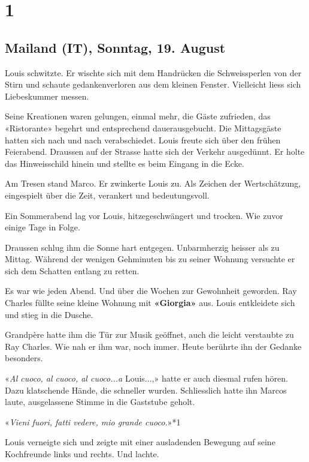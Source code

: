 \chapter{1}\label{section}
\endgroup

\section{Mailand (IT), Sonntag, 19.
August}\label{mailand-it-sonntag-19.-august}

Louis schwitzte. Er wischte sich mit dem Handrücken die Schweissperlen
von der Stirn und schaute gedankenverloren aus dem kleinen Fenster.
Vielleicht liess sich Liebeskummer messen.

Seine Kreationen waren gelungen, einmal mehr, die Gäste zufrieden, das
«Ristorante» begehrt und entsprechend dauerausgebucht. Die Mittagsgäste
hatten sich nach und nach verabschiedet. Louis freute sich über den
frühen Feierabend. Draussen auf der Strasse hatte sich der Verkehr
ausgedünnt. Er holte das Hinweisschild hinein und stellte es beim
Eingang in die Ecke.

Am Tresen stand Marco. Er zwinkerte Louis zu. Als Zeichen der
Wertschätzung, eingespielt über die Zeit, verankert und bedeutungsvoll.

Ein Sommerabend lag vor Louis, hitzegeschwängert und trocken. Wie zuvor
einige Tage in Folge.

Draussen schlug ihm die Sonne hart entgegen. Unbarmherzig heisser als zu
Mittag. Während der wenigen Gehminuten bis zu seiner Wohnung versuchte
er sich dem Schatten entlang zu retten.

Es war wie jeden Abend. Und über die Wochen zur Gewohnheit geworden. Ray
Charles füllte seine kleine Wohnung mit \textbf{«Giorgia»} aus. Louis
entkleidete sich und stieg in die Dusche.

Grandpère hatte ihm die Tür zur Musik geöffnet, auch die leicht
verstaubte zu Ray Charles. Wie nah er ihm war, noch immer. Heute
berührte ihn der Gedanke besonders.

«\emph{Al cuoco, al cuoco, al cuoco...a} Louis...,» hatte er auch
diesmal rufen hören. Dazu klatschende Hände, die schneller wurden.
Schliesslich hatte ihn Marcos laute, ausgelassene Stimme in die
Gaststube geholt.

«\emph{Vieni fuori, fatti vedere, mio grande cuoco.}»*1

Louis verneigte sich und zeigte mit einer ausladenden Bewegung auf seine
Kochfreunde links und rechts. Und lachte.

